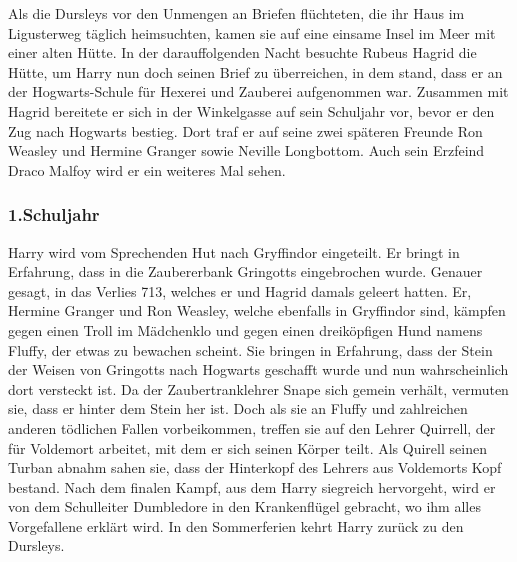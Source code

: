 \documentclass[a4paper, 10pt]{article}
\begin{document}
\vspace{10pt}
\newline
{}  
Als die Dursleys vor den Unmengen an Briefen flüchteten, die ihr Haus im Ligusterweg täglich heimsuchten, kamen sie auf eine einsame Insel im Meer mit einer alten Hütte. In der darauffolgenden Nacht besuchte Rubeus Hagrid die Hütte, um Harry nun doch seinen Brief zu überreichen, in dem stand, dass er an der Hogwarts-Schule für Hexerei und Zauberei aufgenommen war.
\vspace{10pt}
\newline
{}  
Zusammen mit Hagrid bereitete er sich in der Winkelgasse auf sein Schuljahr vor, bevor er den Zug nach Hogwarts bestieg. Dort traf er auf seine zwei späteren Freunde Ron Weasley und Hermine Granger sowie Neville Longbottom. Auch sein Erzfeind Draco Malfoy wird er ein weiteres Mal sehen.
\subsubsection*{\large 1.Schuljahr}
Harry wird vom Sprechenden Hut nach Gryffindor eingeteilt. Er bringt in Erfahrung, dass in die Zaubererbank Gringotts eingebrochen wurde. Genauer gesagt, in das Verlies 713, welches er und Hagrid damals geleert hatten.
\vspace{10pt}
\newline
{}  
Er, Hermine Granger und Ron Weasley, welche ebenfalls in Gryffindor sind, kämpfen gegen einen Troll im Mädchenklo und gegen einen dreiköpfigen Hund namens Fluffy, der etwas zu bewachen scheint. Sie bringen in Erfahrung, dass der Stein der Weisen von Gringotts nach Hogwarts geschafft wurde und nun wahrscheinlich dort versteckt ist.
\vspace{10pt}
\newline
{}  
Da der Zaubertranklehrer Snape sich gemein verhält, vermuten sie, dass er hinter dem Stein her ist. Doch als sie an Fluffy und zahlreichen anderen tödlichen Fallen vorbeikommen, treffen sie auf den Lehrer Quirrell, der für Voldemort arbeitet, mit dem er sich seinen Körper teilt. Als Quirell seinen Turban abnahm sahen sie, dass der Hinterkopf des Lehrers aus Voldemorts Kopf bestand.
\vspace{10pt}
\newline
{}  
Nach dem finalen Kampf, aus dem Harry siegreich hervorgeht, wird er von dem Schulleiter Dumbledore in den Krankenflügel gebracht, wo ihm alles Vorgefallene erklärt wird. In den Sommerferien kehrt Harry zurück zu den Dursleys.
\end{document}
